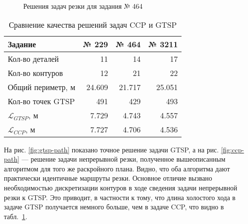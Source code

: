 \begin{figure}
  \centering
  \caption{Решения задач резки для задания № 464}
  \label{fig:solutions-path}
\end{figure}

\begin{table}
  \centering
  \caption{Сравнение качества решений задач CCP и GTSP}
  \label{tab:ccp-vs-gtsp}
  \def\arraystretch{1.2}
  \begin{tabular}{l|*{3}{r}}
      Задание & № 229 & № 464 & № 3211 \\
      \hline
      Кол-во деталей & 11 & 14 & 17\\
      Кол-во контуров & 12 & 21 & 22 \\
      Общий периметр, м & 24.609 & 21.717 & 25.051 \\
      Кол-во точек GTSP & 491 & 429 & 493 \\
      $\mathcal L_{GTSP}$, м & 7.729 & 4.743 & 4.557 \\
      $\mathcal L_{CCP}$, м & 7.727 & 4.706 & 4.536 \\
      \hline
  \end{tabular}
\end{table}

На рис. \ref{fig:gtsp-path}
показано точное решение задачи GTSP,
а на рис. \ref{fig:ccp-path}
--- решение задачи непрерывной резки,
полученное вышеописанным алгоритмом
для того же раскройного плана.
Видно,
что оба алгоритма дают практически идентичные
маршруты резки.
Основное отличие вызвано необходимостью дискретизации
контуров в ходе сведения задачи
непрерывной резки к GTSP.
Это приводит, в частности к тому,
что длина холостого хода в задаче GTSP
получается немного больше,
чем в задаче CCP,
что видно в табл.~\ref{tab:ccp-vs-gtsp}.
